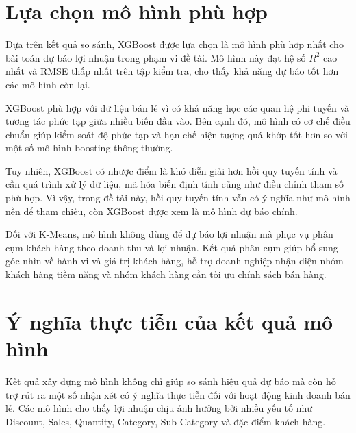 \section{Lựa chọn mô hình phù hợp}

Dựa trên kết quả so sánh, XGBoost được lựa chọn là mô hình phù hợp nhất cho bài toán dự báo lợi nhuận trong phạm vi đề tài. Mô hình này đạt hệ số \(R^2\) cao nhất và RMSE thấp nhất trên tập kiểm tra, cho thấy khả năng dự báo tốt hơn các mô hình còn lại.

XGBoost phù hợp với dữ liệu bán lẻ vì có khả năng học các quan hệ phi tuyến và tương tác phức tạp giữa nhiều biến đầu vào. Bên cạnh đó, mô hình có cơ chế điều chuẩn giúp kiểm soát độ phức tạp và hạn chế hiện tượng quá khớp tốt hơn so với một số mô hình boosting thông thường.

Tuy nhiên, XGBoost có nhược điểm là khó diễn giải hơn hồi quy tuyến tính và cần quá trình xử lý dữ liệu, mã hóa biến định tính cũng như điều chỉnh tham số phù hợp. Vì vậy, trong đề tài này, hồi quy tuyến tính vẫn có ý nghĩa như mô hình nền để tham chiếu, còn XGBoost được xem là mô hình dự báo chính.

Đối với K-Means, mô hình không dùng để dự báo lợi nhuận mà phục vụ phân cụm khách hàng theo doanh thu và lợi nhuận. Kết quả phân cụm giúp bổ sung góc nhìn về hành vi và giá trị khách hàng, hỗ trợ doanh nghiệp nhận diện nhóm khách hàng tiềm năng và nhóm khách hàng cần tối ưu chính sách bán hàng.

\section{Ý nghĩa thực tiễn của kết quả mô hình}

Kết quả xây dựng mô hình không chỉ giúp so sánh hiệu quả dự báo mà còn hỗ trợ rút ra một số nhận xét có ý nghĩa thực tiễn đối với hoạt động kinh doanh bán lẻ. Các mô hình cho thấy lợi nhuận chịu ảnh hưởng bởi nhiều yếu tố như Discount, Sales, Quantity, Category, Sub-Category và đặc điểm khách hàng.

